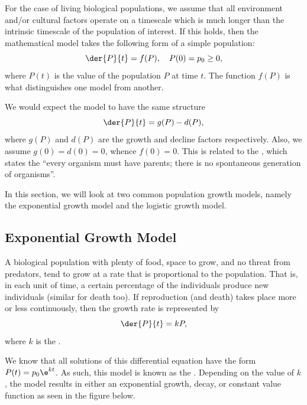 For the case of living biological populations, we assume that all environment and/or cultural factors operate on a timescale which is much longer than the intrinsic timescale of the population of interest. If this holds, then the mathematical model takes the following form of a simple population: \[\der{P}{t} = f(P), \quad P(0) = p_0 \geq 0,\] where $P(t)$ is the value of the population $P$ at time $t$. The function $f(P)$ is what distinguishes one model from another.

We would expect the model to have the same structure \[\der{P}{t} = g(P) - d(P),\] where $g(P)$ and $d(P)$ are the growth and decline factors respectively. Also, we assume $g(0) = d(0) = 0$, whence $f(0) = 0$. This is related to the , which states the ``every organism must have parents; there is no spontaneous generation of organisms''.

In this section, we will look at two common population growth models, namely the exponential growth model and the logistic growth model.

\subsection{Exponential Growth Model}

A biological population with plenty of food, space to grow, and no threat from predators, tend to grow at a rate that is proportional to the population. That is, in each unit of time, a certain percentage of the individuals produce new individuals (similar for death too). If reproduction (and death) takes place more or less continuously, then the growth rate is represented by \[\der{P}{t} = kP,\] where $k$ is the .

We know that all solutions of this differential equation have the form $P(t) = p_0 \e^{k t}$. As such, this model is known as the . Depending on the value of $k$, the model results in either an exponential growth, decay, or constant value function as seen in the figure below.

